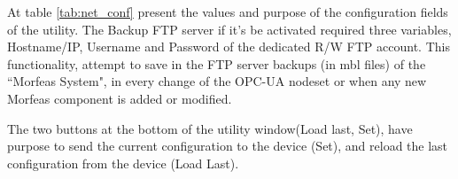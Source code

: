 At table \ref{tab:net_conf} present the values and purpose of the configuration fields of the utility.
The Backup FTP server if it's be activated required three variables, Hostname/IP,
Username and Password of the dedicated R/W FTP account.
This functionality, attempt to save in the FTP server backups (in mbl files) of the ``Morfeas System",
in every change of the OPC-UA nodeset or when any new Morfeas component is added or modified.

\par
The two buttons at the bottom of the utility window(Load last, Set),
have purpose to send the current configuration to the device (Set),
and reload the last configuration from the device (Load Last).